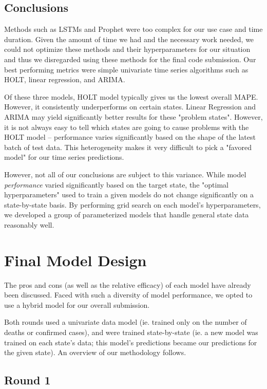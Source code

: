 \documentclass[sigconf,nonacm]{acmart}
\begin{document}
\subsection{Conclusions}

Methods such as LSTMs and Prophet were too complex for our use case and time
duration. Given the amount of time we had and the necessary work needed, we
could not optimize these methods and their hyperparameters for our situation
and thus we disregarded using these methods for the final code submission.
Our best performing metrics were simple univariate time series algorithms such
as HOLT, linear regression, and ARIMA. 

Of these three models, HOLT model typically gives us the lowest overall MAPE.
However, it consistently underperforms on certain states. Linear Regression and
ARIMA may yield significantly better results for these "problem states".
However, it is not always easy to tell which states are going to cause problems
with the HOLT model -- performance varies significantly based on the shape of
the latest batch of test data. This heterogeneity makes it very difficult to
pick a "favored model" for our time series predictions. 

However, not all of our conclusions are subject to this variance. While model
\emph{performance} varied significantly based on the target state, the "optimal
hyperparameters" used to train a given models do not change significantly on a
state-by-state basis. By performing grid search on each model's
hyperparameters, we developed a group of parameterized models that handle
general state data reasonably well. 



\section{Final Model Design}

The pros and cons (as well as the relative efficacy) of each model have already
been discussed. Faced with such a diversity of model performance, we opted to
use a hybrid model for our overall submission. 

Both rounds used a univariate data model (ie. trained only on the number of
deaths or confirmed cases), and were trained state-by-state (ie. a new model
was trained on each state's data; this model's predictions became our
predictions for the given state). An overview of our methodology follows. 

\subsection{Round 1}
\end{document}
